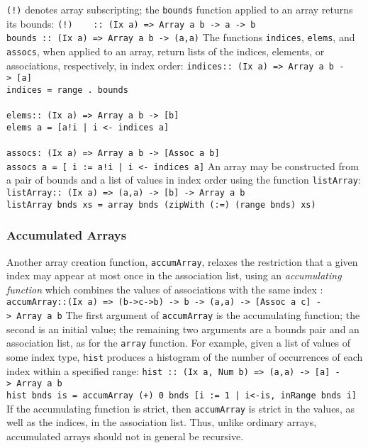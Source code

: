 {\mbox{\tt (!)} denotes
array subscripting; the \mbox{\tt bounds} function
applied to an array returns its bounds:
\bprog
\mbox{\tt (!)\ \ \ \ ::\ (Ix\ a)\ =>\ Array\ a\ b\ ->\ a\ ->\ b}\\
\mbox{\tt bounds\ ::\ (Ix\ a)\ =>\ Array\ a\ b\ ->\ (a,a)}
\eprog
The functions \mbox{\tt indices}, \mbox{\tt elems}, and
\mbox{\tt assocs}, when applied to an array, return lists of
the indices, elements, or associations, respectively, in index order:
\bprog
\mbox{\tt indices::\ (Ix\ a)\ =>\ Array\ a\ b\ ->\ [a]}\\
\mbox{\tt indices\ =\ range\ .\ bounds}\\
\mbox{\tt }\\[-8pt]
\mbox{\tt elems::\ (Ix\ a)\ =>\ Array\ a\ b\ ->\ [b]}\\
\mbox{\tt elems\ a\ =\ [a!i\ |\ i\ <-\ indices\ a]}\\
\mbox{\tt }\\[-8pt]
\mbox{\tt assocs:\ (Ix\ a)\ =>\ Array\ a\ b\ ->\ [Assoc\ a\ b]}\\
\mbox{\tt assocs\ a\ =\ [\ i\ :=\ a!i\ |\ i\ <-\ indices\ a]}
\eprog
An array may be constructed from a pair of bounds and a list
of values in index order using the function \mbox{\tt listArray}:\nopagebreak
\bprog
\mbox{\tt listArray::\ (Ix\ a)\ =>\ (a,a)\ ->\ [b]\ ->\ Array\ a\ b}\\
\mbox{\tt listArray\ bnds\ xs\ =\ array\ bnds\ (zipWith\ (:=)\ (range\ bnds)\ xs)}
\eprogNoSkip

\subsubsection{Accumulated Arrays}

Another array creation function, \mbox{\tt accumArray},
relaxes the restriction that a given index may appear at most once in
the association list, using an {\em accumulating function} which
combines the values of associations with the same index
\cite{nikhil:id-nouveau,wadler:array-primitive}:
\bprog
\mbox{\tt accumArray::(Ix\ a)\ =>\ (b->c->b)\ ->\ b\ ->\ (a,a)\ ->\ [Assoc\ a\ c]\ ->\ Array\ a\ b}
\eprog{}%
The first argument of \mbox{\tt accumArray} is the accumulating function; the
second is an initial value; the remaining two arguments are a bounds
pair and an association list, as for the \mbox{\tt array} function.
For example, given a list of values of some index type, \mbox{\tt hist}
produces a histogram of the number of occurrences of each index within
a specified range:
\bprog
\mbox{\tt hist\ ::\ (Ix\ a,\ Num\ b)\ =>\ (a,a)\ ->\ [a]\ ->\ Array\ a\ b}\\
\mbox{\tt hist\ bnds\ is\ =\ accumArray\ (+)\ 0\ bnds\ [i\ :=\ 1\ |\ i<-is,\ inRange\ bnds\ i]}
\eprog
If the accumulating function is strict, then \mbox{\tt accumArray} is
strict in the values, as well as the indices, in the
association list.  Thus, unlike ordinary arrays,
accumulated arrays should not in general be recursive.

}
